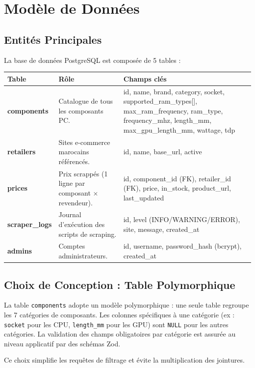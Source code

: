 \documentclass[12pt,a4paper]{article}
\begin{document}
\section{Modèle de Données}

\subsection{Entités Principales}

La base de données PostgreSQL est composée de 5 tables :

\begin{longtable}{>{\bfseries}p{3cm} p{4cm} p{6.5cm}}
\toprule
\textbf{Table} & \textbf{Rôle} & \textbf{Champs clés} \\
\midrule
\endhead
components &
Catalogue de tous les composants PC. &
id, name, brand, category, socket, supported\_ram\_types[], max\_ram\_frequency, ram\_type, frequency\_mhz, length\_mm, max\_gpu\_length\_mm, wattage, tdp \\
\midrule
retailers &
Sites e-commerce marocains référencés. &
id, name, base\_url, active \\
\midrule
prices &
Prix scrappés (1 ligne par composant × revendeur). &
id, component\_id (FK), retailer\_id (FK), price, in\_stock, product\_url, last\_updated \\
\midrule
scraper\_logs &
Journal d'exécution des scripts de scraping. &
id, level (INFO/WARNING/ERROR), site, message, created\_at \\
\midrule
admins &
Comptes administrateurs. &
id, username, password\_hash (bcrypt), created\_at \\
\bottomrule
\end{longtable}

\subsection{Choix de Conception : Table Polymorphique}

La table \texttt{components} adopte un modèle polymorphique : une seule table regroupe les 7 catégories de composants. Les colonnes spécifiques à une catégorie (ex : \texttt{socket} pour les CPU, \texttt{length\_mm} pour les GPU) sont \texttt{NULL} pour les autres catégories. La validation des champs obligatoires par catégorie est assurée au niveau applicatif par des schémas Zod.

Ce choix simplifie les requêtes de filtrage et évite la multiplication des jointures.
\end{document}
